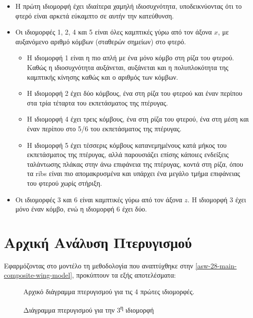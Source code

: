 \begin{itemize}
\item
  Η πρώτη ιδιομορφή έχει ιδιαίτερα χαμηλή ιδιοσυχνότητα, υποδεικνύοντας ότι το φτερό είναι αρκετά εύκαμπτο σε αυτήν την κατεύθυνση.
\item
  Οι ιδιομορφές 1, 2, 4 και 5 είναι όλες καμπτικές γύρω από τον άξονα $x$, 
  με αυξανόμενο αριθμό κόμβων (σταθερών σημείων) στο φτερό.

  \begin{itemize}
  \item
    Η ιδιομορφή 1 είναι η πιο απλή με ένα μόνο κόμβο στη ρίζα του φτερού. Καθώς η ιδιοσυχνότητα αυξάνεται, αυξάνεται και η πολυπλοκότητα της καμπτικής κίνησης καθώς και ο αριθμός των κόμβων.
  \item
    Η ιδιομορφή 2 έχει δύο κόμβους, ένα στη ρίζα του φτερού και έναν περίπου στα τρία τέταρτα του εκπετάσματος της πτέρυγας.
  \item
    Η ιδιομορφή 4 έχει τρεις κόμβους, ένα στη ρίζα του φτερού, ένα στη μέση και έναν περίπου στο 5/6 του εκπετάσματος της πτέρυγας.
  \item
    Η ιδιομορφή 5 έχει τέσσερις κόμβους κατανεμημένους κατά μήκος του εκπετάσματος της πτέρυγας, αλλά παρουσιάζει επίσης κάποιες ενδείξεις ταλάντωσης πλάκας στην άνω επιφάνεια της πτέρυγας, κοντά στη ρίζα, όπου τα \textlatin{ribs} είναι πιο απομακρυσμένα και υπάρχει ένα μεγάλο τμήμα επιφάνειας του φτερού χωρίς στήριξη.
  \end{itemize}
\item
  Οι ιδιομορφές 3 και 6 είναι καμπτικές γύρω από τον άξονα $z$. Η ιδιομορφή 3 έχει μόνο έναν κόμβο, ενώ η ιδιομορφή 6 έχει δύο.
\end{itemize}


\section{Αρχική Ανάλυση Πτερυγισμού}
\label{initial-flutter-analysis}

Εφαρμόζοντας στο μοντέλο τη μεθοδολογία που αναπτύχθηκε στην \autoref{asw-28-main-composite-wing-model}, προκύπτουν τα εξής αποτελέσματα:


\begin{figure}[H]
    \centering
    
    \caption{Αρχικό διάγραμμα πτερυγισμού για τις 4 πρώτες ιδιομορφές.}
    \label{fig:initflutter}
\end{figure}


\begin{figure}[H]
    \centering
    
    \caption{Διάγραμμα πτερυγισμού για την 3\textsuperscript{η} ιδιομορφή}
    \label{fig:initfluttermode3}
\end{figure}

